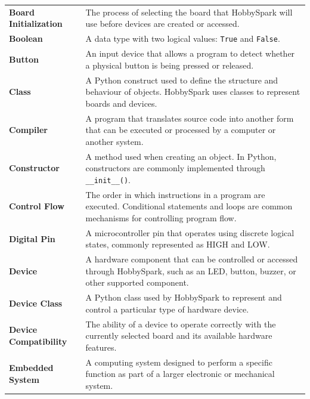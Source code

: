 \documentclass[11pt]{book}
\begin{document}
\begin{longtable}{p{} p{}}
    \textbf{Board Initialization} &
    The process of selecting the board that HobbySpark will use before devices are created or accessed. \\

    \textbf{Boolean} &
    A data type with two logical values: \texttt{True} and \texttt{False}. \\

    \textbf{Button} &
    An input device that allows a program to detect whether a physical button is being pressed or released. \\

    \textbf{Class} &
    A Python construct used to define the structure and behaviour of objects. HobbySpark uses classes to represent boards and devices. \\

    \textbf{Compiler} &
    A program that translates source code into another form that can be executed or processed by a computer or another system. \\

    \textbf{Constructor} &
    A method used when creating an object. In Python, constructors are commonly implemented through \texttt{\_\_init\_\_()}. \\

    \textbf{Control Flow} &
    The order in which instructions in a program are executed. Conditional statements and loops are common mechanisms for controlling program flow. \\

    \textbf{Digital Pin} &
    A microcontroller pin that operates using discrete logical states, commonly represented as HIGH and LOW. \\

    \textbf{Device} &
    A hardware component that can be controlled or accessed through HobbySpark, such as an LED, button, buzzer, or other supported component. \\

    \textbf{Device Class} &
    A Python class used by HobbySpark to represent and control a particular type of hardware device. \\

    \textbf{Device Compatibility} &
    The ability of a device to operate correctly with the currently selected board and its available hardware features. \\

    \textbf{Embedded System} &
    A computing system designed to perform a specific function as part of a larger electronic or mechanical system. \\


\end{longtable}
\end{document}
